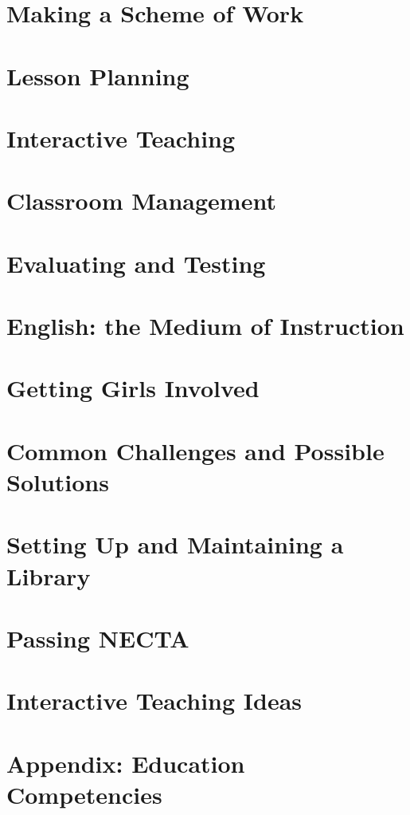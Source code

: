\documentclass[12pt,a4paper]{book}
\begin{document}
\chapter{Making a Scheme of Work}


\chapter{Lesson Planning}


\chapter{Interactive Teaching}


\chapter{Classroom Management}


\chapter{Evaluating and Testing}


\chapter{English: the Medium of Instruction}


\chapter{Getting Girls Involved}


\chapter{Common Challenges and Possible Solutions}


\chapter{Setting Up and Maintaining a Library}


\chapter{Passing NECTA}


\chapter{Interactive Teaching Ideas}


\chapter{Appendix: Education Competencies}

\end{document}
